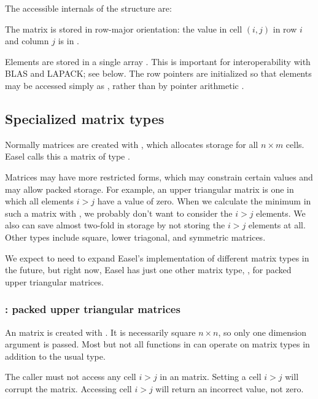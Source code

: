 The accessible internals of the  structure are:



The matrix is stored in row-major orientation: the value in cell
$(i,j)$ in row $i$ and column $j$ is in .

Elements are stored in a single array . This is
important for interoperability with BLAS and LAPACK; see below. The
row pointers  are initialized so that elements may be
accessed simply as , rather than by pointer
arithmetic .

\subsection{Specialized matrix types}

Normally matrices are created with ,
which allocates storage for all $n \times m$ cells. Easel calls this a
matrix of type . 

Matrices may have more restricted forms, which may constrain certain
values and may allow packed storage. For example, an upper triangular
matrix is one in which all elements $i>j$ have a value of zero. When
we calculate the minimum in such a matrix with
, we probably don't want to consider the
$i>j$ elements. We also can save almost two-fold in storage by not
storing the $i>j$ elements at all. Other types include square, lower
triagonal, and symmetric matrices.

We expect to need to expand Easel's implementation of different matrix
types in the future, but right now, Easel has just one other matrix
type, , for packed upper triangular matrices.

\subsubsection{: packed upper triangular matrices}

An  matrix is created with
. It is necessarily square $n
\times n$, so only one dimension argument is passed. Most but not all
functions in  can operate on  matrix
types in addition to the usual  type.

The caller must not access any cell $i>j$ in an 
matrix. Setting a cell $i>j$ will corrupt the matrix. Accessing cell
$i>j$ will return an incorrect value, not zero.

